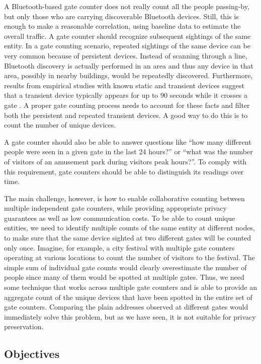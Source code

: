 A Bluetooth-based gate counter does not really count all the people
passing-by, but only those who are carrying discoverable Bluetooth
devices. Still, this is enough to make a reasonable correlation, using
baseline data to estimate the overall traffic. A gate counter should
recognize subsequent sightings of the same entity. In a gate counting
scenario, repeated sightings of the same device can be very common
because of persistent devices. Instead of scanning through a line,
Bluetooth discovery is actually performed in an area and thus any
device in that area, possibly in nearby buildings, would be repeatedly
discovered. Furthermore, results from empirical studies with known
static and transient devices suggest that a transient device typically
appears for up to 90 seconds while it crosses a gate
\cite{Oneill:2006vq}. A proper gate counting process needs to account for
these facts and filter both the persistent and repeated transient
devices. A good way to do this is to count the number of unique devices.

A gate counter should also be able to answer questions like ``how many
different people were seen in a given gate in the last 24 hours?'' or
``what was the number of visitors of an amusement park during visitors
peak hours?''. To comply with this requirement, gate counters should
be able to distinguish its readings over time.

The main challenge, however, is how to enable collaborative counting
between multiple independent gate counters, while providing
appropriate privacy guarantees as well as low communication costs. To
be able to count unique entities, we need to identify multiple counts
of the same entity at different nodes, to make sure that the same
device sighted at two different gates will be counted only once.
Imagine, for example, a city festival with multiple gate counters
operating at various locations to count the number of visitors to the
festival. The simple sum of individual gate counts would clearly
overestimate the number of people since many of them would be spotted
at multiple gates. Thus, we need some technique that works across
multiple gate counters and is able to provide an aggregate count of
the unique devices that have been spotted in the entire set
of gate counters. Comparing the plain addresses observed at different
gates would immediately solve this problem, but as we have seen, it is
not suitable for privacy preservation.

\subsection{Objectives}
\label{sec:objectives}

